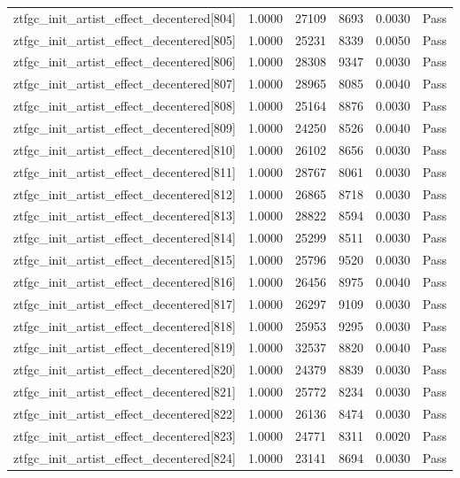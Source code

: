 \begin{table}[htbp]
\begin{tabular}{llrrll}
ztfgc\_init\_artist\_effect\_decentered[804] & 1.0000 & 27109 & 8693 & 0.0030 & Pass \\
ztfgc\_init\_artist\_effect\_decentered[805] & 1.0000 & 25231 & 8339 & 0.0050 & Pass \\
ztfgc\_init\_artist\_effect\_decentered[806] & 1.0000 & 28308 & 9347 & 0.0030 & Pass \\
ztfgc\_init\_artist\_effect\_decentered[807] & 1.0000 & 28965 & 8085 & 0.0040 & Pass \\
ztfgc\_init\_artist\_effect\_decentered[808] & 1.0000 & 25164 & 8876 & 0.0030 & Pass \\
ztfgc\_init\_artist\_effect\_decentered[809] & 1.0000 & 24250 & 8526 & 0.0040 & Pass \\
ztfgc\_init\_artist\_effect\_decentered[810] & 1.0000 & 26102 & 8656 & 0.0030 & Pass \\
ztfgc\_init\_artist\_effect\_decentered[811] & 1.0000 & 28767 & 8061 & 0.0030 & Pass \\
ztfgc\_init\_artist\_effect\_decentered[812] & 1.0000 & 26865 & 8718 & 0.0030 & Pass \\
ztfgc\_init\_artist\_effect\_decentered[813] & 1.0000 & 28822 & 8594 & 0.0030 & Pass \\
ztfgc\_init\_artist\_effect\_decentered[814] & 1.0000 & 25299 & 8511 & 0.0030 & Pass \\
ztfgc\_init\_artist\_effect\_decentered[815] & 1.0000 & 25796 & 9520 & 0.0030 & Pass \\
ztfgc\_init\_artist\_effect\_decentered[816] & 1.0000 & 26456 & 8975 & 0.0040 & Pass \\
ztfgc\_init\_artist\_effect\_decentered[817] & 1.0000 & 26297 & 9109 & 0.0030 & Pass \\
ztfgc\_init\_artist\_effect\_decentered[818] & 1.0000 & 25953 & 9295 & 0.0030 & Pass \\
ztfgc\_init\_artist\_effect\_decentered[819] & 1.0000 & 32537 & 8820 & 0.0040 & Pass \\
ztfgc\_init\_artist\_effect\_decentered[820] & 1.0000 & 24379 & 8839 & 0.0030 & Pass \\
ztfgc\_init\_artist\_effect\_decentered[821] & 1.0000 & 25772 & 8234 & 0.0030 & Pass \\
ztfgc\_init\_artist\_effect\_decentered[822] & 1.0000 & 26136 & 8474 & 0.0030 & Pass \\
ztfgc\_init\_artist\_effect\_decentered[823] & 1.0000 & 24771 & 8311 & 0.0020 & Pass \\
ztfgc\_init\_artist\_effect\_decentered[824] & 1.0000 & 23141 & 8694 & 0.0030 & Pass \\

\end{tabular}
\end{table}
